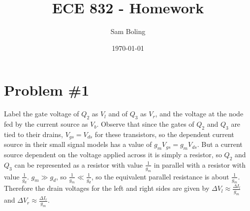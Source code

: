 \documentclass{article}
\title{ECE 832 - Homework}
\author{Sam Boling}
\date{\today}
\begin{document}
\maketitle

\section*{Problem \#1}

Label the gate voltage of $Q_2$ as $V_l$ and of $Q_3$ as $V_r$, and the
voltage at the node fed by the current source as $V_b$. Observe that since
the gates of $Q_2$ and $Q_3$ are tied to their drains, $V_{gs} = V_{ds}$ for
these transistors, so the dependent current source in their small signal models
has a value of $g_m V_{gs} = g_m V_{ds}$. But a current source dependent on the
voltage applied across it is simply a resistor, so $Q_2$ and $Q_3$ can be 
represented as a resistor with value $\frac{1}{g_m}$ in parallel with a 
resistor with value $\frac{1}{g_d}$. $g_m \gg g_d$, so 
$\frac{1}{g_m} \ll \frac{1}{g_d}$, so the equivalent parallel resistance is
about $\frac{1}{g_m}$. Therefore the drain voltages for the left and right
sides are given by $\Delta V_l \approx \frac{\Delta I_l}{g_m}$ and
$\Delta V_r \approx \frac{\Delta I_r}{g_m}$.
\end{document}
